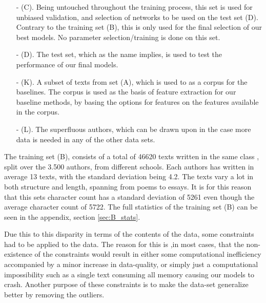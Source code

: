 \begin{itemize}
\begin{itemize}
\begin{itemize}
\end{itemize}


\item[- (C).]
Being untouched throughout the training process, this set is used for unbiased
validation, and selection of networks to be used on the test set (D). Contrary
to the training set (B), this is only used for the final selection of our best 
models. No parameter selection/training is done on this set.


\item[- (D).]
The test set, which as the name implies, is used to test the
performance of our final models.

\item[- (K).]
A subset of texts from set (A),  which is used to as a corpus for the baselines.
The corpus is used as the basis of feature extraction for our baseline methods,
by basing the options for features on the features available in the corpus.

\item[- (L).]
The superfluous authors, which can be drawn upon in the case more data is needed
in any of the other data sets.

\end{itemize}

\end{itemize}


The training set (B), consists of a total of 46620 texts written in the same
class , split over the 3.500 authors, from different schools. Each authors has
written in average 13 texts, with the standard deviation being 4.2. The texts
vary a lot in both structure and length, spanning from poems to essays. It is
for this reason that this sets character count has a standard deviation of 5261
even though the average character count of 5722. The full statistics of the
training set (B) can be seen in the appendix, section \ref{sec:B_stats}.

Due this to this disparity in terms of the contents of the data, some
constraints had to be applied to the data. The reason for this is ,in most
cases, that the non-existence of the constraints would result in either some
computational inefficiency accompanied by a minor increase in data-quality, or
simply just a computational impossibility such as a single text consuming all
memory causing our models to crash. Another purpose of these constraints is to
make the data-set generalize better by removing the outliers.

